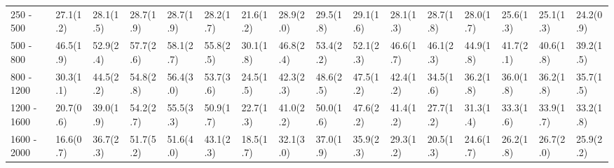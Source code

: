 \begin{table}
{\begin{tabular}{llllllllllllllll}
\multicolumn{1}{l||}{250 - 500} & 	\multicolumn{1}{l|}{27.1(1.2)} & \multicolumn{1}{l|}{28.1(1.5)} & \multicolumn{1}{l|}{28.7(1.9)} 						& \multicolumn{1}{l|}{28.7(1.9)} 					& \multicolumn{1}{l||}{28.2(1.7)} & \multicolumn{1}{l|}{21.6(1.2)} & \multicolumn{1}{l|}{28.9(2.0)} & \multicolumn{1}{l|}{\cellcolor{Red!50}29.5(1.8)} 		& \multicolumn{1}{l|}{29.1(1.6)} & \multicolumn{1}{l||}{28.1(1.3)} & \multicolumn{1}{l|}{28.7(1.8)} & \multicolumn{1}{l|}{28.0(1.7)} & \multicolumn{1}{l|}{25.6(1.3)} & \multicolumn{1}{l|}{25.1(1.3)} & \multicolumn{1}{l|}{24.2(0.9)} \\
\multicolumn{1}{l||}{500 - 800} & 	\multicolumn{1}{l|}{46.5(1.9)} & \multicolumn{1}{l|}{52.9(2.4)} & \multicolumn{1}{l|}{57.7(2.6)} 						& \multicolumn{1}{l|}{\cellcolor{Red!50}58.1(2.7)} 	& \multicolumn{1}{l||}{55.8(2.5)} & \multicolumn{1}{l|}{30.1(1.8)} & \multicolumn{1}{l|}{46.8(2.4)} & \multicolumn{1}{l|}{53.4(2.2)} 						& \multicolumn{1}{l|}{52.1(2.3)} & \multicolumn{1}{l||}{46.6(1.7)} & \multicolumn{1}{l|}{46.1(2.3)} & \multicolumn{1}{l|}{44.9(1.8)} & \multicolumn{1}{l|}{41.7(2.1)} & \multicolumn{1}{l|}{40.6(1.8)} & \multicolumn{1}{l|}{39.2(1.5)} \\
\multicolumn{1}{l||}{800 - 1200} & 	\multicolumn{1}{l|}{30.3(1.1)} & \multicolumn{1}{l|}{44.5(2.2)} & \multicolumn{1}{l|}{54.8(2.8)} 						& \multicolumn{1}{l|}{\cellcolor{Red!50}56.4(3.0)} 	& \multicolumn{1}{l||}{53.7(3.6)} & \multicolumn{1}{l|}{24.5(1.5)} & \multicolumn{1}{l|}{42.3(2.3)} & \multicolumn{1}{l|}{48.6(2.5)} 						& \multicolumn{1}{l|}{47.5(1.2)} & \multicolumn{1}{l||}{42.4(1.2)} & \multicolumn{1}{l|}{34.5(1.6)} & \multicolumn{1}{l|}{36.2(1.8)} & \multicolumn{1}{l|}{36.0(1.8)} & \multicolumn{1}{l|}{36.2(1.8)} & \multicolumn{1}{l|}{35.7(1.5)} \\
\multicolumn{1}{l||}{1200 - 1600} & \multicolumn{1}{l|}{20.7(0.6)} & \multicolumn{1}{l|}{39.0(1.9)} & \multicolumn{1}{l|}{54.2(2.7)} 						& \multicolumn{1}{l|}{\cellcolor{Red!50}55.5(3.3)} 	& \multicolumn{1}{l||}{50.9(1.7)} & \multicolumn{1}{l|}{22.7(1.3)} & \multicolumn{1}{l|}{41.0(2.2)} & \multicolumn{1}{l|}{50.0(1.6)} 						& \multicolumn{1}{l|}{47.6(2.2)} & \multicolumn{1}{l||}{41.4(1.2)} & \multicolumn{1}{l|}{27.7(1.2)} & \multicolumn{1}{l|}{31.3(1.4)} & \multicolumn{1}{l|}{33.3(1.6)} & \multicolumn{1}{l|}{33.9(1.7)} & \multicolumn{1}{l|}{33.2(1.8)} \\
\multicolumn{1}{l||}{1600 - 2000} & \multicolumn{1}{l|}{16.6(0.7)} & \multicolumn{1}{l|}{36.7(2.3)} & \multicolumn{1}{l|}{\cellcolor{Red!50}51.7(5.2)} 		& \multicolumn{1}{l|}{51.6(4.0)} 					& \multicolumn{1}{l||}{43.1(2.3)} & \multicolumn{1}{l|}{18.5(1.7)} & \multicolumn{1}{l|}{32.1(3.0)} & \multicolumn{1}{l|}{37.0(1.9)} 						& \multicolumn{1}{l|}{35.9(2.3)} & \multicolumn{1}{l||}{29.3(1.2)} & \multicolumn{1}{l|}{20.5(1.3)} & \multicolumn{1}{l|}{24.6(1.7)} & \multicolumn{1}{l|}{26.2(1.8)} & \multicolumn{1}{l|}{26.7(2.0)} & \multicolumn{1}{l|}{25.9(2.2)} \\

\end{tabular}}
\end{table}
